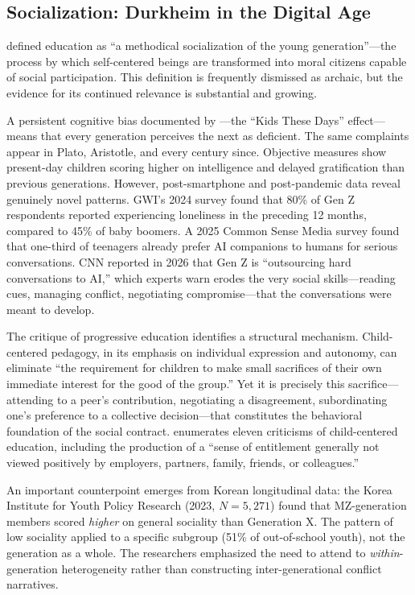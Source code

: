 \documentclass[12pt]{article}
\begin{document}
\subsection{Socialization: Durkheim in the Digital Age}
\label{sec:socialization}

\citet{Durkheim1956education} defined education as ``a methodical socialization of the young generation''---the process by which self-centered beings are transformed into moral citizens capable of social participation. This definition is frequently dismissed as archaic, but the evidence for its continued relevance is substantial and growing.

A persistent cognitive bias documented by \citet{Protzko2019kids}---the ``Kids These Days'' effect---means that every generation perceives the next as deficient. The same complaints appear in Plato, Aristotle, and every century since. Objective measures show present-day children scoring higher on intelligence and delayed gratification than previous generations. However, post-smartphone and post-pandemic data reveal genuinely novel patterns. GWI's 2024 survey found that 80\% of Gen Z respondents reported experiencing loneliness in the preceding 12 months, compared to 45\% of baby boomers. A 2025 Common Sense Media survey found that one-third of teenagers already prefer AI companions to humans for serious conversations. CNN reported in 2026 that Gen Z is ``outsourcing hard conversations to AI,'' which experts warn erodes the very social skills---reading cues, managing conflict, negotiating compromise---that the conversations were meant to develop.

The \citet{Fordham2023individualism} critique of progressive education identifies a structural mechanism. Child-centered pedagogy, in its emphasis on individual expression and autonomy, can eliminate ``the requirement for children to make small sacrifices of their own immediate interest for the good of the group.'' Yet it is precisely this sacrifice---attending to a peer's contribution, negotiating a disagreement, subordinating one's preference to a collective decision---that constitutes the behavioral foundation of the social contract. \citet{Shah2019childcentered} enumerates eleven criticisms of child-centered education, including the production of a ``sense of entitlement generally not viewed positively by employers, partners, family, friends, or colleagues.''

An important counterpoint emerges from Korean longitudinal data: the Korea Institute for Youth Policy Research (2023, $N = 5{,}271$) found that MZ-generation members scored \emph{higher} on general sociality than Generation X. The pattern of low sociality applied to a specific subgroup (51\% of out-of-school youth), not the generation as a whole. The researchers emphasized the need to attend to \emph{within}-generation heterogeneity rather than constructing inter-generational conflict narratives.
\end{document}
